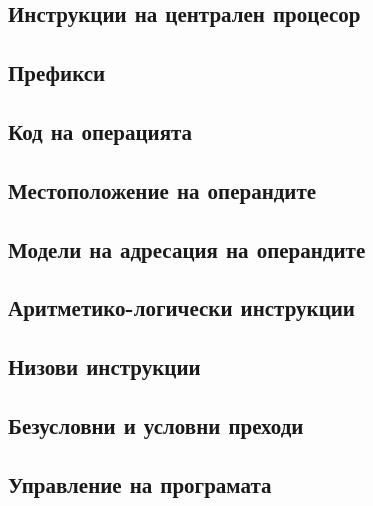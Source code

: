 \documentclass[fleqn,12pt]{article}
\begin{document}
\begin{flushleft}
\section{Инструкции на централен процесор}
\subsection{Префикси}
\subsection{Код на операцията}
\subsection{Местоположение на операндите}
\subsection{Модели на адресация на операндите}
\subsection{Аритметико-логически инструкции}
\subsection{Низови инструкции}
\subsection{Безусловни и условни преходи}
\subsection{Управление на програмата}


\end{flushleft}
\end{document}
